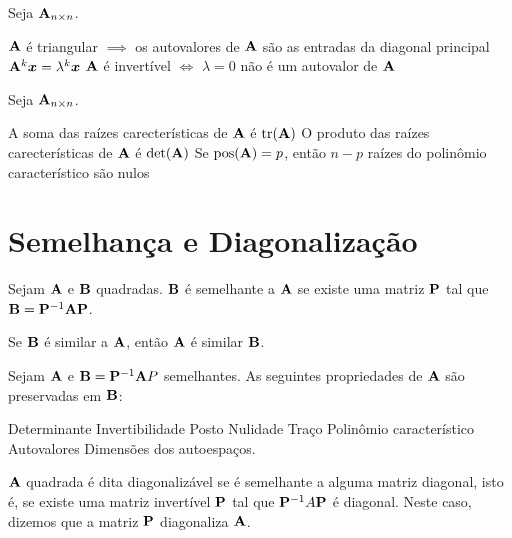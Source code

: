 \begin{theorem} Seja $\mathbf{A}_{n\times n}$.
	\leavevmode
	\begin{outline}[enumerate]
		\1 $\mathbf{A}$ é triangular $\implies$ os autovalores de $\mathbf{A}$ são as entradas da diagonal principal
		\1 \( \mathbf{A}^k \bm{x}= \lambda^k\bm{x} \)
		\1 $\mathbf{A}$ é invertível $\iff$ $\lambda=0$ não é um autovalor de $\mathbf{A}$
	\end{outline}
\end{theorem}


\begin{theorem} Seja $\mathbf{A}_{n\times n}$.
	\leavevmode
	\begin{outline}[enumerate]
		\1 A soma das raízes carecterísticas de $\mathbf{A}$ é $\operatorname{tr}(\mathbf{A})$
		\1 O produto das raízes carecterísticas de $\mathbf{A}$ é $\det(\mathbf{A})$
		\1 Se $\operatorname{pos}(\mathbf{A}) = p$, então $n-p$ raízes do polinômio característico são nulos 
	\end{outline}
\end{theorem}


\section{Semelhança e Diagonalização}

\begin{definition}
	Sejam $\mathbf{A}$ e $\mathbf{B}$ quadradas. $\mathbf{B}$ é semelhante a $\mathbf{A}$ se existe uma matriz $\mathbf{P}$ tal que $\mathbf{B} = \mathbf{P}^{-1} \mathbf{A}\mathbf{P}$.
	\begin{note}
		\begin{outline}[enumerate]
			Se $\mathbf{B}$ é similar a $\mathbf{A}$, então $\mathbf{A}$ é similar $\mathbf{B}$.
		\end{outline}
	\end{note}
\end{definition}

\begin{theorem}
	Sejam $\mathbf{A}$ e $\mathbf{B}=\mathbf{P}^{-1}\mathbf{A} P$ semelhantes. As seguintes propriedades de $\mathbf{A}$ são preservadas em $\mathbf{B}$:
	\begin{outline}[enumerate]
		\1 Determinante
		\1 Invertibilidade
		\1 Posto
		\1 Nulidade
		\1 Traço
		\1 Polinômio característico
		\1 Autovalores
		\1 Dimensões dos autoespaços.
	\end{outline}
\end{theorem}

\begin{definition}
	$\mathbf{A}$ quadrada é dita diagonalizável se é semelhante a alguma matriz diagonal, isto é, se existe uma matriz invertível $\mathbf{P}$ tal que $\mathbf{P}^{-1} A \mathbf{P}$ é diagonal. Neste caso, dizemos que a matriz $\mathbf{P}$ diagonaliza $\mathbf{A}$.
\end{definition}

